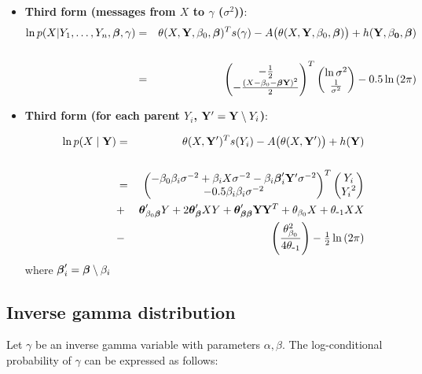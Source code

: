 \documentclass[11pt, oneside]{article}   	%
\numberwithin{figure}{section}
\numberwithin{equation}{section}
\numberwithin{table}{section}
\theoremstyle{definition}
\begin{document}
\begin{appendices}
\begin{itemize}
\item \textbf{Third form (messages from $X$ to $\gamma$ ($\sigma^2$))}:
\begin{eqnarray*}
\ln p(X|Y_1,\ldots,Y_n,\boldsymbol \beta,\gamma) &=& \theta(X,\mathbf Y, \beta_0, \boldsymbol \beta)^T s(\gamma) - A \big(\theta(X,\mathbf Y,\beta_0,\boldsymbol \beta) \big) + h(\mathbf{\mathbf Y,\beta_0, \boldsymbol \beta})\\\\
&=&
\begin{pmatrix}
-\frac{1}{2}\\
-\frac{(X-\beta_0-\boldsymbol \beta\mathbf Y)^2}{2}
\end{pmatrix}^T
\begin{pmatrix}
\ln{\sigma^2}\\
\frac{1}{\sigma^2}
\end{pmatrix}
 - 0.5\ln{(2\pi)}
\end{eqnarray*}

\item \textbf{Third form (for each parent $Y_i$, $\mathbf Y' = \mathbf Y \setminus Y_i $)}: 

\begin{eqnarray*}
\ln p(X\mid \mathbf{Y}) &=& \theta(X,\mathbf Y')^T s(Y_i) - A \big(\theta(X,\mathbf Y') \big) + h(\mathbf{Y})\\\\
&=&
\begin{pmatrix}
-\beta_0\beta_i \sigma^{-2} + \beta_i X \sigma^{-2} - \beta_i\boldsymbol \beta_i' \mathbf Y' \sigma^{-2} \\
-0.5\beta_i\beta_i \sigma^{-2} 
\end{pmatrix}^T
\begin{pmatrix}
Y_i\\
{Y_i}^2\\
\end{pmatrix}\\
&+& \boldsymbol \theta_{\beta_0\boldsymbol \beta}'Y + 2\boldsymbol \theta_{\boldsymbol \beta}'XY  + \boldsymbol \theta_{\boldsymbol \beta\boldsymbol \beta}'\mathbf Y\mathbf Y^T + \theta_{\beta_0}X + \theta_{\mbox{-}1}XX \\
&-& \left( \frac{\theta_{\beta_0}^2}{4\theta_{\mbox{-}1}} \right) - \tfrac{1}{2}\ln{(2\pi)}
\end{eqnarray*}
where $\boldsymbol \beta_i' = \boldsymbol \beta \setminus \beta_i$ \\

\end{itemize}


\subsection{Inverse gamma distribution}

Let $\gamma$ be an inverse gamma variable with parameters $\alpha, \beta$. The log-conditional probability of $\gamma$ can be expressed as follows:


\end{appendices}
\end{document}
